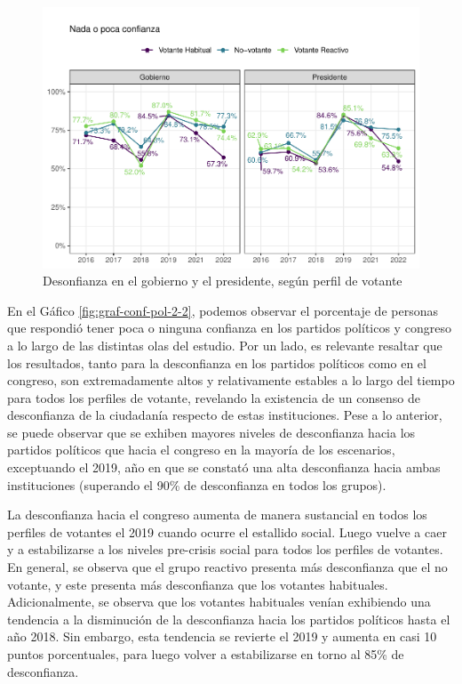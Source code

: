 \documentclass[
  12pt,
]{book}
\begin{document}
\begin{figure}

{\centering \includegraphics{reporte-elsoc_files/figure-latex/graf-conf-pol-2-1} 

}

\caption{Desonfianza en el gobierno y el presidente, según perfil de votante}\label{fig:graf-conf-pol-2}
\end{figure}

En el Gáfico \ref{fig:graf-conf-pol-2-2}, podemos observar el porcentaje de personas que respondió tener poca o ninguna confianza en los partidos políticos y congreso a lo largo de las distintas olas del estudio. Por un lado, es relevante resaltar que los resultados, tanto para la desconfianza en los partidos políticos como en el congreso, son extremadamente altos y relativamente estables a lo largo del tiempo para todos los perfiles de votante, revelando la existencia de un consenso de desconfianza de la ciudadanía respecto de estas instituciones. Pese a lo anterior, se puede observar que se exhiben mayores niveles de desconfianza hacia los partidos políticos que hacia el congreso en la mayoría de los escenarios, exceptuando el 2019, año en que se constató una alta desconfianza hacia ambas instituciones (superando el 90\% de desconfianza en todos los grupos).

La desconfianza hacia el congreso aumenta de manera sustancial en todos los perfiles de votantes el 2019 cuando ocurre el estallido social. Luego vuelve a caer y a estabilizarse a los niveles pre-crisis social para todos los perfiles de votantes. En general, se observa que el grupo reactivo presenta más desconfianza que el no votante, y este presenta más desconfianza que los votantes habituales. Adicionalmente, se observa que los votantes habituales venían exhibiendo una tendencia a la disminución de la desconfianza hacia los partidos políticos hasta el año 2018. Sin embargo, esta tendencia se revierte el 2019 y aumenta en casi 10 puntos porcentuales, para luego volver a estabilizarse en torno al 85\% de desconfianza.
\end{document}
